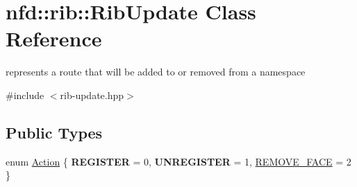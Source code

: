 \hypertarget{classnfd_1_1rib_1_1RibUpdate}{}\section{nfd\+:\+:rib\+:\+:Rib\+Update Class Reference}
\label{classnfd_1_1rib_1_1RibUpdate}


represents a route that will be added to or removed from a namespace  




{\ttfamily \#include $<$rib-\/update.\+hpp$>$}

\subsection*{Public Types}
\begin{DoxyCompactItemize}
\item 
enum \hyperlink{classnfd_1_1rib_1_1RibUpdate_aab70f45176a2e455a92b555dba35b91e}{Action} \{ {\bfseries R\+E\+G\+I\+S\+T\+ER} = 0, 
{\bfseries U\+N\+R\+E\+G\+I\+S\+T\+ER} = 1, 
\hyperlink{classnfd_1_1rib_1_1RibUpdate_aab70f45176a2e455a92b555dba35b91eae2772cc285a7b66f79fdb6cfa4fd4282}{R\+E\+M\+O\+V\+E\+\_\+\+F\+A\+CE} = 2
 \}
\end{DoxyCompactItemize}
